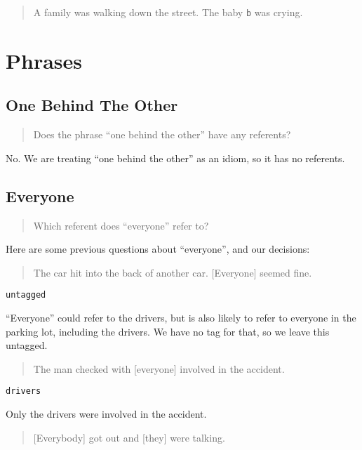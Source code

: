 \documentclass[
]{book}
\begin{document}
\begin{quote}
A family was walking down the street.
The baby \texttt{b} was crying.
\end{quote}

\hypertarget{phrases}{%
\section{Phrases}\label{phrases}}

\hypertarget{one-behind-the-other}{%
\subsection{One Behind The Other}\label{one-behind-the-other}}

\begin{quote}
Does the phrase ``one behind the other'' have any referents?
\end{quote}

No.
We are treating ``one behind the other'' as an idiom, so it has no referents.

\hypertarget{everyone}{%
\subsection{Everyone}\label{everyone}}

\begin{quote}
Which referent does ``everyone'' refer to?
\end{quote}

Here are some previous questions about ``everyone'', and our decisions:

\begin{quote}
The car hit into the back of another car.
{[}Everyone{]} seemed fine.
\end{quote}

\texttt{untagged}

``Everyone'' could refer to the drivers,
but is also likely to refer to everyone in the parking lot,
including the drivers.
We have no tag for that, so we leave this untagged.

\begin{quote}
The man checked with {[}everyone{]} involved in the accident.
\end{quote}

\texttt{drivers}

Only the drivers were involved in the accident.

\begin{quote}
{[}Everybody{]} got out and {[}they{]} were talking.
\end{quote}
\end{document}
